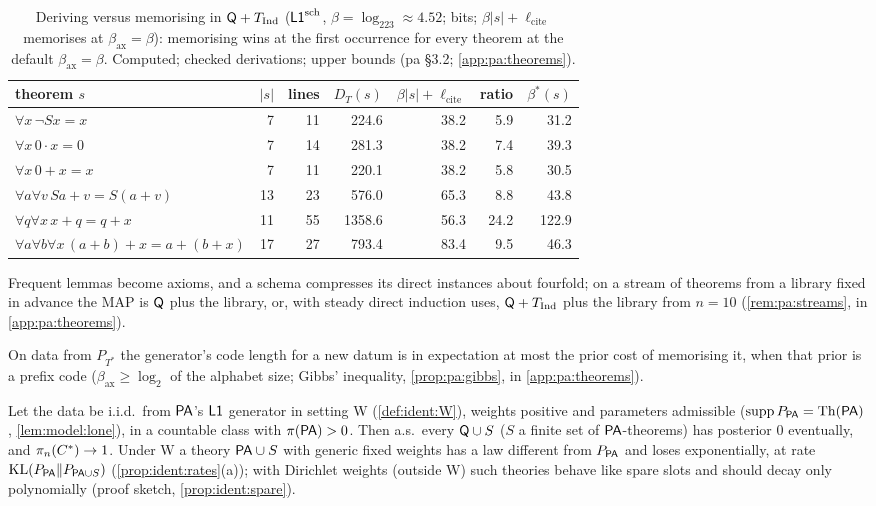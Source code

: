 \begin{table}[t]\centering\footnotesize
\begin{tabular}{@{}lrrrrrr@{}}
\toprule
theorem $s$ & $|s|$ & lines & $D_T(s)$ & $\beta|s|+\ell_{\mathrm{cite}}$ & ratio & $\beta^*(s)$\\
\midrule
$\forall x\,\neg Sx=x$ & 7 & 11 & 224.6 & 38.2 & 5.9 & 31.2\\
$\forall x\,0\cdot x=0$ & 7 & 14 & 281.3 & 38.2 & 7.4 & 39.3\\
$\forall x\,0+x=x$ & 7 & 11 & 220.1 & 38.2 & 5.8 & 30.5\\
$\forall a\forall v\,Sa+v=S(a+v)$ & 13 & 23 & 576.0 & 65.3 & 8.8 & 43.8\\
$\forall q\forall x\,x+q=q+x$ & 11 & 55 & 1358.6 & 56.3 & 24.2 & 122.9\\
$\forall a\forall b\forall x\,(a+b)+x=a+(b+x)$ & 17 & 27 & 793.4 & 83.4 & 9.5 & 46.3\\
\bottomrule
\end{tabular}
\caption{Deriving versus memorising in $\mathsf{Q}+T_{\mathrm{Ind}}$ ($\mathord{\mathsf{L1}}^{\mathrm{sch}}$, $\beta=\log_223\approx4.52$; bits; $\beta|s|+\ell_{\mathrm{cite}}$ memorises at $\beta_{\mathrm{ax}}=\beta$): memorising wins at the first occurrence for every theorem at the default $\beta_{\mathrm{ax}}=\beta$. Computed; checked derivations; upper bounds (pa \S3.2; \cref{app:pa:theorems}).}\label{tab:pa:theorems}
\end{table}

\noindent Frequent lemmas become axioms, and a schema compresses its direct instances about fourfold; on a stream of theorems from a library fixed in advance the MAP is $\mathsf{Q}$ plus the library, or, with steady direct induction uses, $\mathsf{Q}+T_{\mathrm{Ind}}$ plus the library from $n=10$ (\cref{rem:pa:streams}, in \cref{app:pa:theorems}).

\noindent On data from $P_{T^*}$ the generator's code length for a new datum is in expectation at most the prior cost of memorising it, when that prior is a prefix code ($\beta_{\mathrm{ax}}\ge\log_2$ of the alphabet size; Gibbs' inequality, \cref{prop:pa:gibbs}, in \cref{app:pa:theorems}).

\begin{proposition}\pabrk{}\label{prop:pa:wellspec}
Let the data be i.i.d.\ from $\mathsf{PA}$'s $\mathord{\mathsf{L1}}$ generator in setting W (\cref{def:ident:W}), weights positive and parameters admissible ($\operatorname{supp}P_{\mathsf{PA}}=\mathrm{Th}(\mathsf{PA})$, \cref{lem:model:lone}), in a countable class with $\pi(\mathsf{PA})>0$. Then a.s.\ every $\mathsf{Q}\cup S$ ($S$ a finite set of $\mathsf{PA}$-theorems) has posterior $0$ eventually, and $\pi_n(C^{*})\to1$. Under W a theory $\mathsf{PA}\cup S$ with generic fixed weights has a law different from $P_{\mathsf{PA}}$ and loses exponentially, at rate $\mathrm{KL}(P_{\mathsf{PA}}\|P_{\mathsf{PA}\cup S})$ (\cref{prop:ident:rates}(a)); with Dirichlet weights (outside W) such theories behave like spare slots and should decay only polynomially (proof sketch, \cref{prop:ident:spare}).
\end{proposition}

